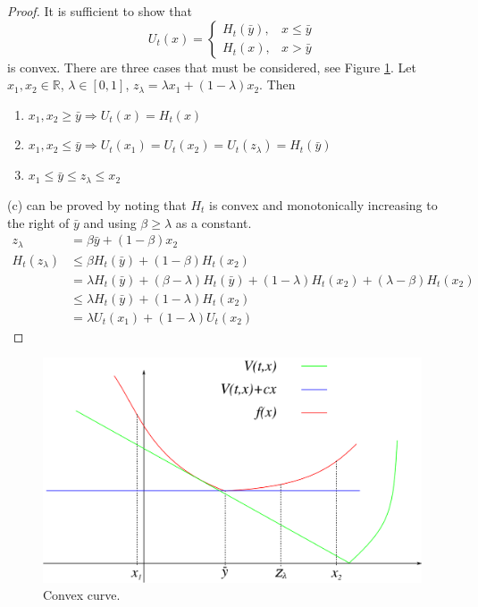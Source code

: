 \begin{proof}
It is sufficient to show that
$$U_t(x) = \begin{cases} H_t(\bar{y}), & x\leq\bar{y} \\ H_t(x), & x>\bar{y} \end{cases}$$
is convex. There are three cases that must be considered, see Figure \ref{fig:06curve}. Let $x_1,x_2\in\mathbb{R}$, $\lambda\in[0,1]$, $z_\lambda = \lambda x_1 + (1-\lambda)x_2$. Then
\begin{enumerate}
\item $x_1,x_2\geq\bar{y} \Rightarrow U_t(x) = H_t(x)$
\item $x_1,x_2\leq\bar{y} \Rightarrow U_t(x_1) = U_t(x_2) = U_t(z_\lambda) = H_t(\bar{y})$
\item $x_1\leq\bar{y}\leq z_\lambda\leq x_2$
\end{enumerate}
(c) can be proved by noting that $H_t$ is convex and monotonically increasing to the right of $\bar{y}$ and using $\beta\geq\lambda$ as a constant.
\begin{align*}
z_\lambda &= \beta\bar{y} + (1-\beta)x_2 \\
H_t(z_\lambda) &\leq \beta H_t(\bar{y})+(1-\beta)H_t(x_2) \\
&= \lambda H_t(\bar{y})+(\beta-\lambda)H_t(\bar{y}) + (1-\lambda)H_t(x_2) + (\lambda-\beta)H_t(x_2) \\
&\leq \lambda H_t(\bar{y}) + (1-\lambda)H_t(x_2) \\
&= \lambda U_t(x_1) + (1-\lambda)U_t(x_2)
\end{align*}
\end{proof}

\begin{figure}[ht!]
	\centering
	\includegraphics[width=.5\textwidth]{images/06curve}
	\caption{Convex curve.}
	\label{fig:06curve}
\end{figure}

